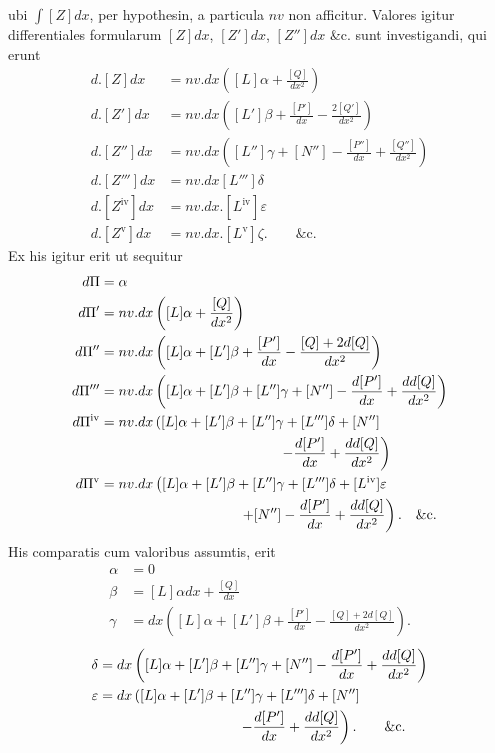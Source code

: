 ubi $\int[Z]dx$, per hypothesin, a particula $nv$ non afficitur. Valores igitur differentiales formularum $[Z]dx$, $[Z']dx$, $[Z'']dx$ \&c. sunt investigandi, qui erunt
\[
\begin{aligned}
d.[Z]dx&=nv.dx\left([L]\alpha+\frac{[Q]}{dx^2}\right)\\
d.[Z']dx&=nv.dx\left([L']\beta+\frac{[P']}{dx}-\frac{2[Q']}{dx^2}\right)\\
d.[Z'']dx&=nv.dx\left([L'']\gamma+[N'']-\frac{[P'']}{dx}+\frac{[Q'']}{dx^2}\right)\\
d.[Z''']dx&=nv.dx[L''']\delta\\
d.[Z^{\mathrm{iv}}]dx&=nv.dx.[L^{\mathrm{iv}}]\varepsilon\\
d.[Z^{\mathrm{v}}]dx&=nv.dx.[L^{\mathrm{v}}]\zeta.\qquad\text{\&c.}
\end{aligned}
\]
Ex his igitur erit ut sequitur
\[
\begin{aligned}
d\Pi&=\alpha\\
d\Pi'&=nv.dx\left([L]\alpha+\frac{[Q]}{dx^2}\right)\\
d\Pi''&=nv.dx\left([L]\alpha+[L']\beta+\frac{[P']}{dx}-\frac{[Q]+2d[Q]}{dx^2}\right)\\
d\Pi'''&=nv.dx\left([L]\alpha+[L']\beta+[L'']\gamma+[N'']-\frac{d[P']}{dx}+\frac{dd[Q]}{dx^2}\right)\\
d\Pi^{\mathrm{iv}}&=nv.dx\left([L]\alpha+[L']\beta+[L'']\gamma+[L''']\delta+[N'']\right.\\
&\hspace{45mm}\left.-\frac{d[P']}{dx}+\frac{dd[Q]}{dx^2}\right)\\
d\Pi^{\mathrm{v}}&=nv.dx\left([L]\alpha+[L']\beta+[L'']\gamma+[L''']\delta+[L^{\mathrm{iv}}]\varepsilon\right.\\
&\hspace{35mm}\left.+[N'']-\frac{d[P']}{dx}+\frac{dd[Q]}{dx^2}\right).\quad\text{\&c.}
\end{aligned}
\]
His comparatis cum valoribus assumtis, erit
\[
\begin{aligned}
\alpha&=0\\
\beta&=[L]\alpha dx+\frac{[Q]}{dx}\\
\gamma&=dx\left([L]\alpha+[L']\beta+\frac{[P']}{dx}-\frac{[Q]+2d[Q]}{dx^2}\right).
\end{aligned}
\]
\[
\begin{aligned}
\delta&=dx\left([L]\alpha+[L']\beta+[L'']\gamma+[N'']-\frac{d[P']}{dx}+\frac{dd[Q]}{dx^2}\right)\\
\varepsilon&=dx\left([L]\alpha+[L']\beta+[L'']\gamma+[L''']\delta+[N'']\right.\\
&\hspace{35mm}\left.-\frac{d[P']}{dx}+\frac{dd[Q]}{dx^2}\right).\qquad\text{\&c.}
\end{aligned}
\]

